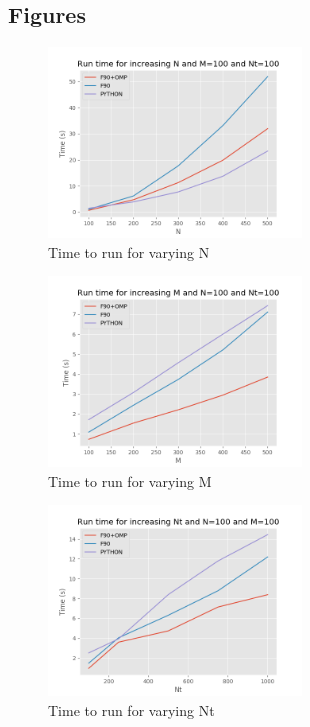 \documentclass{article}
\begin{document}
\subsection*{Figures}
\begin{figure}[h!]
\centering
\includegraphics[width=0.6\textwidth]{n_time_comparison.png}
\caption{Time to run for varying N}
\label{figN}
\end{figure}
\FloatBarrier
\begin{figure}[h!]
\centering
\includegraphics[width=0.6\textwidth]{m_time_comparison.png}
\caption{Time to run for varying M}
\label{figM}
\end{figure}
\FloatBarrier
\begin{figure}[h!]
\centering
\includegraphics[width=0.6\textwidth]{nt_time_comparison.png}
\caption{Time to run for varying Nt}
\label{figNt}
\end{figure}
\FloatBarrier
\end{document}
